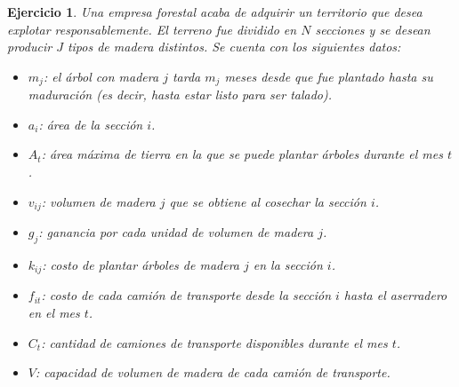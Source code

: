 \documentclass[a4paper,oneside,12pt]{amsart}
\newtheorem{quest}{Ejercicio}
\begin{document}



\begin{quest} 

    Una empresa forestal acaba de adquirir un territorio que desea explotar responsablemente. El terreno fue dividido en $N$ secciones y se desean producir $J$ tipos de madera distintos. Se cuenta con los siguientes datos:
    \begin{itemize}
        \item $m_j$: el árbol con madera $j$ tarda $m_j$ meses desde que fue plantado hasta su maduración (es decir, hasta estar listo para ser talado).
        \item $a_i$: área de la sección $i$.
        \item $A_t$: área máxima de tierra en la que se puede plantar árboles durante el mes $t$.
        \item $v_{ij}$: volumen de madera $j$ que se obtiene al cosechar la sección $i$.
        \item $g_j$: ganancia por cada unidad de volumen de madera $j$.
        \item $k_{ij}$: costo de plantar árboles de madera $j$ en la sección $i$. 
        \item $f_{it}$: costo de cada camión de transporte desde la sección $i$ hasta el aserradero en el mes $t$.
        \item $C_t$: cantidad de camiones de transporte disponibles durante el mes $t$.
        \item $V$: capacidad de volumen de madera de cada camión de transporte.
    \end{itemize}
    

\end{quest}
\end{document}
